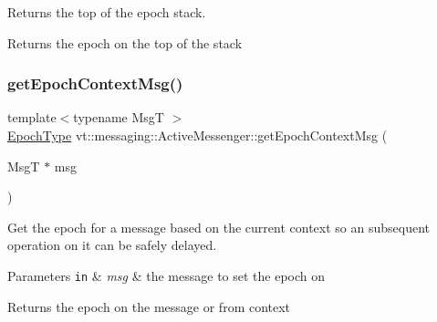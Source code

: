 Returns the top of the epoch stack. 

\begin{DoxyReturn}{Returns}
the epoch on the top of the stack 
\end{DoxyReturn}
\mbox{\label{structvt_1_1messaging_1_1_active_messenger_aa60710a2d4a1ac7fe60113fd8cbb9809}} 
\subsubsection{\texorpdfstring{get\+Epoch\+Context\+Msg()}{getEpochContextMsg()}\hspace{0.1cm}{\footnotesize\ttfamily [1/2]}}
{\footnotesize\ttfamily template$<$typename MsgT $>$ \\
\hyperlink{namespacevt_a81d11b28122d43bf9834577e4a06440f}{Epoch\+Type} vt\+::messaging\+::\+Active\+Messenger\+::get\+Epoch\+Context\+Msg (\begin{DoxyParamCaption}\item[{MsgT $\ast$}]{msg }\end{DoxyParamCaption})\hspace{0.3cm}{\ttfamily [inline]}}



Get the epoch for a message based on the current context so an subsequent operation on it can be safely delayed. 


\begin{DoxyParams}[1]{Parameters}
\mbox{\tt in}  & {\em msg} & the message to set the epoch on\\
\hline
\end{DoxyParams}
\begin{DoxyReturn}{Returns}
the epoch on the message or from context 
\end{DoxyReturn}
\mbox{\label{structvt_1_1messaging_1_1_active_messenger_a66c64223357aa92f45a4a4042bd63a5f}} 
